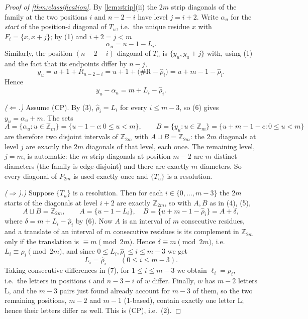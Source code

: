 \documentclass[11pt,a4paper]{article}
\theoremstyle{definition}
\theoremstyle{remark}
\newcommand{\Zd}{\ensuremath{\mathbb{Z}}}
\newcommand{\Li}{\mathrm{L}}
\newcommand{\Ri}{\mathrm{R}}
\begin{document}
\begin{proof}[\textit{Proof of \cref{thm:classification}}]
By \cref{lem:strip}(ii) the $2m$ strip diagonals of the family at the two positions $i$ and
$n-2-i$ have level $j=i+2$.  Write $\alpha_u$ for the \emph{start} of the position-$i$
diagonal of $T_u$, i.e.\ the unique residue $x$ with $F_i=\{x,x+j\}$; by (1) and $i+2=j<m$
\[
  \alpha_u=u-1-L_i . \tag{4}
\]
Similarly, the position-$(n-2-i)$ diagonal of $T_u$ is $\{y_u,y_u+j\}$ with, using (1) and
the fact that its endpoints differ by $n-j$,
\[
  y_u=u+1+R_{n-2-i}=u+1+\big(\#\Ri-\widehat\rho_i\big)=u+m-1-\widehat\rho_i . \tag{5}
\]
Hence
\[
  y_u-\alpha_u=m+L_i-\widehat\rho_i . \tag{6}
\]

\emph{($\Leftarrow$.)}  Assume (CP).  By (3), $\widehat\rho_i=L_i$ for every
$i\le m-3$, so (6) gives $y_u=\alpha_u+m$.  The sets
\[
  A=\{\alpha_u:u\in\Zd_m\}=\{u-1-c:0\le u<m\},\qquad
  B=\{y_u:u\in\Zd_m\}=\{u+m-1-c:0\le u<m\}
\]
are therefore two disjoint intervals of $\Zd_{2m}$ with $A\sqcup B=\Zd_{2m}$: the $2m$ diagonals
at level $j$ are exactly the $2m$ diagonals of that level, each once.  The remaining level,
$j=m$, is automatic: the $m$ strip diagonals at position $m-2$ are $m$ distinct diameters
(the family is edge-disjoint) and there are exactly $m$ diameters.  So every diagonal of
$P_{2m}$ is used exactly once and $\{T_u\}$ is a resolution.

\emph{($\Rightarrow$).)}  Suppose $\{T_u\}$ is a resolution.  Then for each
$i\in\{0,\dots,m-3\}$ the $2m$ starts of the diagonals at level $i+2$ are exactly
$\Zd_{2m}$, so with $A,B$ as in (4), (5),
\[
  A\sqcup B=\Zd_{2m},\qquad A=\{u-1-L_i\},\quad B=\{u+m-1-\widehat\rho_i\}=A+\delta,
\]
where $\delta=m+L_i-\widehat\rho_i$ by (6).  Now $A$ is an interval of $m$ consecutive
residues, and a translate of an interval of $m$ consecutive residues is its complement in
$\Zd_{2m}$ only if the translation is $\equiv m\pmod{2m}$.  Hence
$\delta\equiv m\pmod{2m}$, i.e.\ $L_i\equiv\widehat\rho_i\pmod{2m}$, and since
$0\le L_i,\widehat\rho_i\le i\le m-3$ we get
\[
  L_i=\widehat\rho_i\qquad(0\le i\le m-3). \tag{7}
\]
Taking consecutive differences in (7), for $1\le i\le m-3$ we obtain
$\ell_i=\rho_i$, i.e.\ the letters in positions $i$ and $n-3-i$ of $w$ differ.  Finally,
$w$ has $m-2$ letters $\Li$, and the $m-3$ pairs just found already account for $m-3$ of
them, so the two remaining positions, $m-2$ and $m-1$ (1-based), contain exactly one
letter $\Li$; hence their letters differ as well.  This is (CP), i.e.\ (2).
\end{proof}
\end{document}
